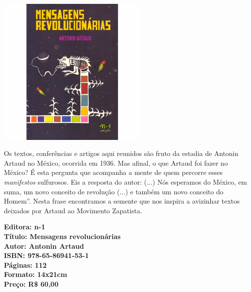 \pagebreak

\begin{center}
\hspace*{-3.6cm}
\hspace*{3.1cm}\includegraphics[width=74mm]{./CAPAS/N-1_MENSAGENS.jpg}
\end{center}

\hspace*{-7cm}\hrulefill\hspace*{-7cm}

\medskip

\noindent{}Os textos, conferências e artigos aqui reunidos são fruto da estadia de Antonin Artaud no México, ocorrida em 1936. Mas afinal, o que Artaud foi fazer no México? É esta pergunta que acompanha a mente de quem percorre esses \textit{manifestos} sulfurosos. Eis a resposta do autor:  (...) Nós esperamos do México, em suma, um novo conceito de revolução (...) e também um novo conceito do Homem''. Nesta frase encontramos a semente que nos inspira a avizinhar textos deixados por Artaud ao Movimento Zapatista.

\vfill

\hspace*{-.4cm}\begin{minipage}[c]{.5\linewidth}
\small\textbf{
\hspace*{-.1cm}Editora: n-1\\
Título: Mensagens revolucionárias\\
Autor: Antonin Artaud\\ 
ISBN: 978-65-86941-53-1\\
Páginas: 112\\
Formato: 14x21cm\\
Preço: R\$ 60,00\\
}
\end{minipage}


